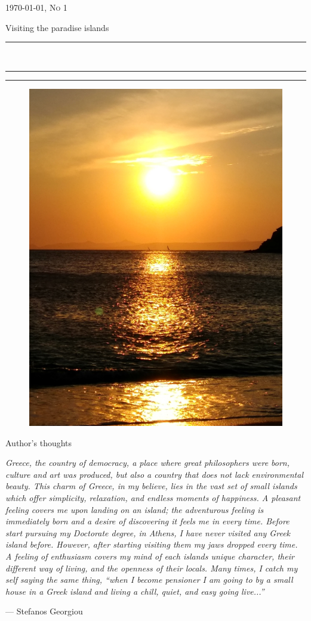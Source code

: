 \documentclass[10pt,a4paper]{article} %
\newcommand{\HorRule}[1]{\noindent\rule{\linewidth}{#1}} %
\newcommand{\SepRule}{\noindent	%
\begin{center}
\rule{250pt}{1pt} %
\end{center}
}
\newcommand{\NewsletterName}[1]{ %
\begin{center}
\Huge \usefont{T1}{fvs}{b}{n} %
#1
\end{center}	
\par \normalsize \normalfont}
\newcommand{\JournalIssue}[1]{ %
\hfill \textsc{\mydate \today, No #1} %
\par \normalsize \normalfont}
\newcommand{\NewsItem}[1]{ %
\usefont{T1}{fvs}{n}{n} %
\vspace{24pt}\large #1\vspace{3pt} %
\par \normalsize \normalfont}
\begin{document}
\JournalIssue{1} %

\NewsletterName{Visiting the paradise islands} %

\noindent\HorRule{3pt} \\[-0.75\baselineskip] %
\HorRule{1pt} %


\vspace{0.5cm}
\SepRule
\vspace{-0.5cm}

\begin{center}
\begin{minipage}[h]{0.84\linewidth}
\begin{figure}
\includegraphics[width=0.4 \textwidth]{media/front_picture.jpg}
\\
\end{figure}
	
\NewsItem{Author's thoughts} %
\vspace{3pt} %
\textit{
Greece, the country of democracy, a place where great philosophers were born, 
culture and art was produced, but also a country that does not lack environmental 
beauty. 
This charm of Greece, in my believe, lies in the vast set of small islands which offer 
simplicity, relaxation, and endless moments of happiness. 
A pleasant feeling covers me upon landing on an island; the adventurous feeling 
is immediately born and a desire of discovering it feels me in every time. 
Before start pursuing my Doctorate degree, in Athens, I have never visited any 
Greek island before. 
However, after starting visiting them my jaws dropped every time. 
A feeling of enthusiasm covers my mind of each islands unique character, 
their different way of living, and the openness of their locals.
Many times, I catch my self saying the same thing, ``when I become pensioner I am 
going to by a small house in a Greek island and living a chill, quiet, and easy 
going live...''
}
\par\hfill --- Stefanos Georgiou
\end{minipage}
\end{center}
\end{document}
